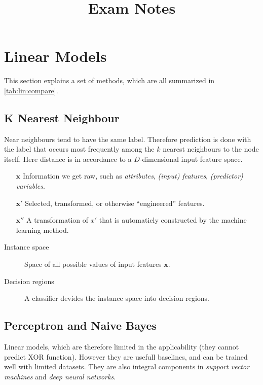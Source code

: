 \title{Exam Notes}
\tableofcontents

\section{Linear Models}

This section explains a set of methods, which are all summarized in \cref{tab:lin:compare}.

\subsection{K Nearest Neighbour}

Near neighbours tend to have the same label.
Therefore prediction is done with the label that occurs most frequently among the $k$ nearest neighbours to the node itself.
Here distance is in accordance to a $D$-dimensional input feature space.

\begin{mdframed}[frametitle={A Note on Features}]
    \begin{itemize}
        \item[$\mathbf{x}$] Information we get raw, such as \emph{attributes}, \emph{(input) features}, \emph{(predictor) variables}.
        \item[$\mathbf{x'}$] Selected, transformed, or otherwise ``engineered'' features.
        \item[$\mathbf{x''}$] A transformation of $x'$ that is automaticly constructed by the machine learning method.
    \end{itemize}
\end{mdframed}

\begin{description}
    \item[Instance space] Space of all possible values of input features $\mathbf{x}$.
    \item[Decision regions] A classifier devides the instance space into decision regions.
\end{description}

\subsection{Perceptron and Naive Bayes}

Linear models, which are therefore limited in the applicability (they cannot predict XOR function).
However they are usefull baselines, and can be trained well with limited datasets.
They are also integral components in \emph{support vector machines} and \emph{deep neural networks}.

